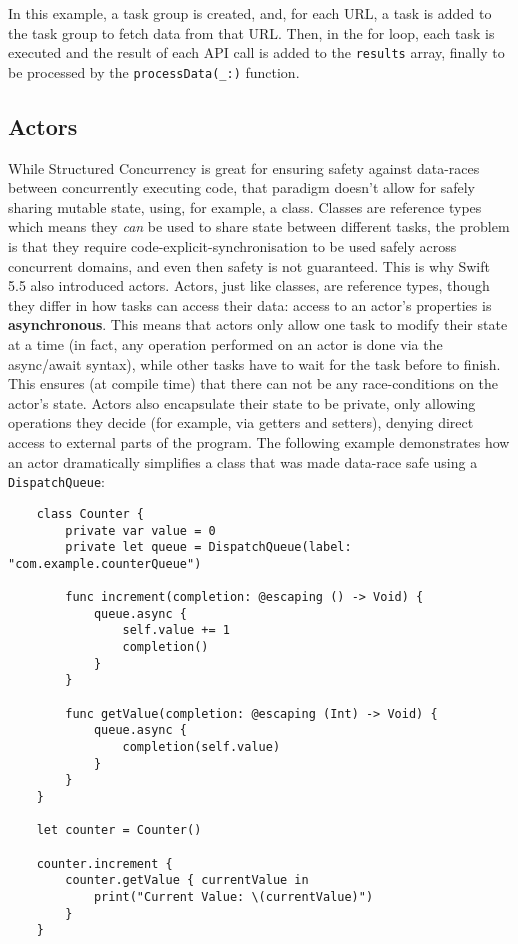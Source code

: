 In this example, a task group is created, and, for each URL, a task is added to the task group to fetch data from that URL. Then, in the for loop, each task is executed and the result of each API call is added to the \lstinline{results} array, finally to be processed by the \lstinline{processData(_:)} function.

\subsection{Actors}
While Structured Concurrency is great for ensuring safety against \gls{data-race}s between concurrently executing code, that paradigm doesn't allow for safely sharing mutable state, using, for example, a class. Classes are reference types which means they \textit{can} be used to share state between different tasks, the problem is that they require code-explicit-synchronisation to be used safely across concurrent domains, and even then safety is not guaranteed.
This is why Swift 5.5 also introduced actors. Actors, just like classes, are reference types, though they differ in how tasks can access their data: access to an actor's properties is \textbf{asynchronous}. This means that actors only allow one task to modify their state at a time (in fact, any operation performed on an actor is done via the async/await syntax), while other tasks have to wait for the task before to finish. This ensures (at compile time) that there can not be any \gls{race-condition}s on the actor's state.
Actors also encapsulate their state to be private, only allowing operations they decide (for example, via getters and setters), denying direct access to external parts of the program. \cite{swift-book}
The following example demonstrates how an actor dramatically simplifies a class that was made data-race safe using a \lstinline{DispatchQueue}:
\begin{verbatim}
    class Counter {
        private var value = 0
        private let queue = DispatchQueue(label: "com.example.counterQueue")
    
        func increment(completion: @escaping () -> Void) {
            queue.async {
                self.value += 1
                completion()
            }
        }
    
        func getValue(completion: @escaping (Int) -> Void) {
            queue.async {
                completion(self.value)
            }
        }    
    }

    let counter = Counter()

    counter.increment {
        counter.getValue { currentValue in
            print("Current Value: \(currentValue)")
        }
    }
\end{verbatim}
